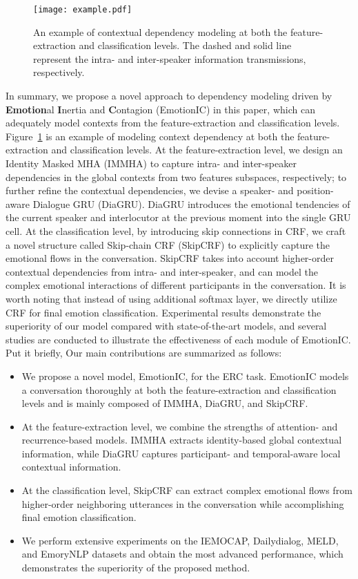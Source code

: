 \documentclass{SCIS2019}
\begin{document}
\begin{figure}[htbp]
	\centering
	\texttt{[image: example.pdf]}
	\caption{An example of contextual dependency modeling at both the feature-extraction and classification levels. The dashed and solid line represent the intra- and inter-speaker information transmissions, respectively.}
	\label{fig:example}
\end{figure}
In summary, we propose a novel approach to dependency modeling driven by \textbf{Emotion}al \textbf{I}nertia and \textbf{C}ontagion (EmotionIC) in this paper, which can adequately model contexts from the feature-extraction and classification levels. Figure~\ref{fig:example} is an example of modeling context dependency at both the feature-extraction and classification levels. At the feature-extraction level, we design an Identity Masked MHA (IMMHA) to capture intra- and inter-speaker dependencies in the global contexts from two features subspaces, respectively; to further refine the contextual dependencies, we devise a speaker- and position-aware Dialogue GRU (DiaGRU). DiaGRU introduces the emotional tendencies of the current speaker and interlocutor at the previous moment into the single GRU cell. At the classification level, by introducing skip connections in CRF, we craft a novel structure called Skip-chain CRF (SkipCRF) to explicitly capture the emotional flows in the conversation. SkipCRF takes into account higher-order contextual dependencies from intra- and inter-speaker, and can model the complex emotional interactions of different participants in the conversation. It is worth noting that instead of using additional softmax layer, we directly utilize CRF for final emotion classification. Experimental results demonstrate the superiority of our model compared with state-of-the-art models, and several studies are conducted to illustrate the effectiveness of each module of EmotionIC.
Put it briefly, Our main contributions are summarized as follows:
\begin{itemize}
	\item We propose a novel model, EmotionIC, for the ERC task. EmotionIC models a conversation thoroughly at both the feature-extraction and classification levels and is mainly composed of IMMHA, DiaGRU, and SkipCRF.
	\item At the feature-extraction level, we combine the strengths of attention- and recurrence-based models. IMMHA extracts identity-based global contextual information, while DiaGRU captures participant- and temporal-aware local contextual information.
	\item At the classification level, SkipCRF can extract complex emotional flows from higher-order neighboring utterances in the conversation while accomplishing final emotion classification.
	\item We perform extensive experiments on the IEMOCAP, Dailydialog, MELD, and EmoryNLP datasets and obtain the most advanced performance, which demonstrates the superiority of the proposed method.
\end{itemize}
\end{document}
